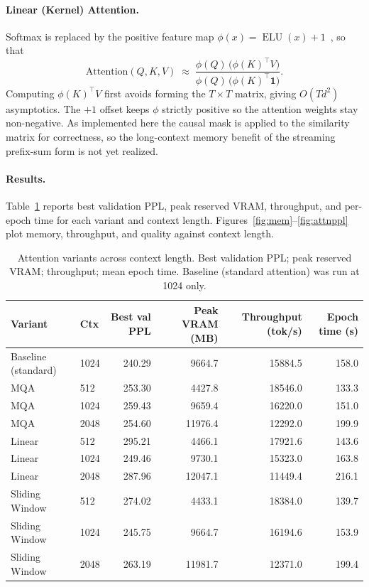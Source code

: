 \documentclass[11pt]{article}
\begin{document}
\paragraph{Linear (Kernel) Attention.} Softmax is replaced by the positive
feature map $\phi(x)=\operatorname{ELU}(x)+1$~\cite{katharopoulos2020}, so that
\[
\text{Attention}(Q,K,V)\;\approx\;\frac{\phi(Q)\,\big(\phi(K)^\top V\big)}
{\phi(Q)\,\big(\phi(K)^\top \mathbf{1}\big)}.
\]
Computing $\phi(K)^\top V$ first avoids forming the $T\times T$ matrix, giving
$O(Td^2)$ asymptotics. The $+1$ offset keeps $\phi$ strictly positive so the
attention weights stay non-negative. As implemented here the causal mask is
applied to the similarity matrix for correctness, so the long-context memory
benefit of the streaming prefix-sum form is not yet realized.

\paragraph{Results.} Table~\ref{tab:attn} reports best validation PPL, peak
reserved VRAM, throughput, and per-epoch time for each variant and context
length. Figures~\ref{fig:mem}--\ref{fig:attnppl} plot memory, throughput, and
quality against context length.

\begin{table}[H]
\centering
\caption{Attention variants across context length. Best validation PPL; peak
reserved VRAM; throughput; mean epoch time. Baseline (standard attention) was
run at 1024 only.}
\label{tab:attn}
\begin{tabular}{llrrrr}
\toprule
Variant & Ctx & Best val PPL & Peak VRAM (MB) & Throughput (tok/s) & Epoch time (s) \\
\midrule
Baseline (standard) & 1024 & 240.29 & 9664.7 & 15884.5 & 158.0 \\
\midrule
MQA            & 512  & 253.30 & 4427.8  & 18546.0 & 133.3 \\
MQA            & 1024 & 259.43 & 9659.4  & 16220.0 & 151.0 \\
MQA            & 2048 & 254.60 & 11976.4 & 12292.0 & 199.9 \\
\midrule
Linear         & 512  & 295.21 & 4466.1  & 17921.6 & 143.6 \\
Linear         & 1024 & 249.46 & 9730.1  & 15323.0 & 163.8 \\
Linear         & 2048 & 287.96 & 12047.1 & 11449.4 & 216.1 \\
\midrule
Sliding Window & 512  & 274.02 & 4433.1  & 18384.0 & 139.7 \\
Sliding Window & 1024 & 245.75 & 9664.7  & 16194.6 & 153.9 \\
Sliding Window & 2048 & 263.19 & 11981.7 & 12371.0 & 199.4 \\
\bottomrule
\end{tabular}
\end{table}
\end{document}
